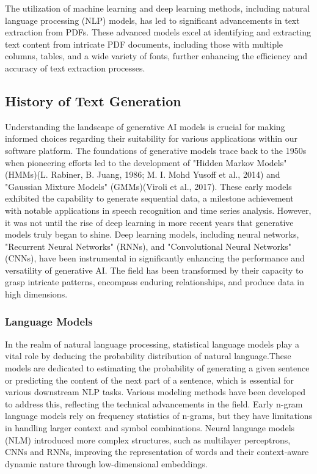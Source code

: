 \documentclass[fleqn,10pt]{thescipub} %
\begin{document}
The utilization of machine learning and deep learning methods, including natural language processing (NLP) models, has led to significant advancements in text extraction from PDFs. These advanced models excel at identifying and extracting text content from intricate PDF documents, including those with multiple columns, tables, and a wide variety of fonts, further enhancing the efficiency and accuracy of text extraction processes.

\subsection{History of Text Generation}

Understanding the landscape of generative AI models is crucial for making informed choices regarding their suitability for various applications within our software platform. The foundations of generative models trace back to the 1950s when pioneering efforts led to the development of "Hidden Markov Models" (HMMs)(L. Rabiner, B. Juang, 1986; M. I. Mohd Yusoff et al., 2014) and "Gaussian Mixture Models" (GMMs)(Viroli et al., 2017). These early models exhibited the capability to generate sequential data, a milestone achievement with notable applications in speech recognition and time series analysis. However, it was not until the rise of deep learning in more recent years that generative models truly began to shine. Deep learning models, including neural networks, "Recurrent Neural Networks" (RNNs), and "Convolutional Neural Networks" (CNNs), have been instrumental in significantly enhancing the performance and versatility of generative AI. The field has been transformed by their capacity to grasp intricate patterns, encompass enduring relationships, and produce data in high dimensions.

\subsubsection{Language Models}

In the realm of natural language processing, statistical language models play a vital role by deducing the probability distribution of natural language.These models are dedicated to estimating the probability of generating a given sentence or predicting the content of the next part of a sentence, which is essential for various downstream NLP tasks. Various modeling methods have been developed to address this, reflecting the technical advancements in the field. Early n-gram language models rely on frequency statistics of n-grams, but they have limitations in handling larger context and symbol combinations. Neural language models (NLM) introduced more complex structures, such as multilayer perceptrons, CNNs and RNNs, improving the representation of words and their context-aware dynamic nature through low-dimensional embeddings.
\end{document}
